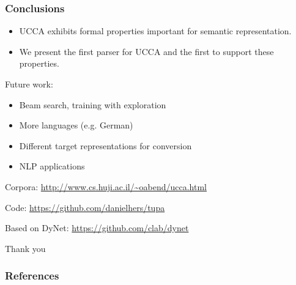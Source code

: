 \documentclass[t]{beamer}
\begin{document}
\begin{frame}
\frametitle{Conclusions}
\begin{itemize}
 \item UCCA exhibits formal properties important for semantic representation.
 \item We present the first parser for UCCA and the first to support these properties.
\end{itemize}

\vfill
Future work:
\begin{itemize}
 \item Beam search, training with exploration
 \item More languages (e.g. German)
 \item Different target representations for conversion
 \item NLP applications
\end{itemize}

\vfill
Corpora: \url{http://www.cs.huji.ac.il/~oabend/ucca.html}

Code: \url{https://github.com/danielhers/tupa}

Based on DyNet: \url{https://github.com/clab/dynet}
\end{frame}



\begin{frame}
\vfill
\begin{center}
\LARGE
Thank you
\end{center}
\end{frame}



\begin{frame}[allowframebreaks]
\frametitle{References}

\tiny
\end{frame}
\end{document}
